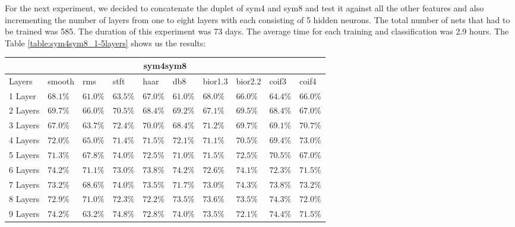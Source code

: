 For the next experiment, we decided to concatenate the duplet of sym4 and sym8 and test it against all the other features and also incrementing the number of layers from one to eight layers with each consisting of 5 hidden neurons. The total number of nets that had to be trained was 585. The duration of this experiment was 73 days. The average time for each training and classification was 2.9 hours. The Table \ref{table:sym4sym8_1-5layers} shows us the results:
\begin{table}[h!]
\renewcommand{\arraystretch}{1.2}
\begin{tabular}{ |p{1.7cm}||p{1.2cm}|p{1cm}|p{1cm}|p{1cm}|p{1cm}|p{1.1cm}|p{1.1cm}|p{1cm}|p{1cm}|}
 \hline
 \multicolumn{10}{|c|}{sym4sym8} \\
 \hline
 Layers  & smooth & rms & stft & haar & db8 & bior1.3 & bior2.2 & coif3 & coif4\\
 \hline
 1 Layer  & \cellcolor{blue!35}$68.1\%$ & $61.0\%$ &$63.5\%$ &\cellcolor{blue!35}$67.0\%$ &$61.0\%$ &\cellcolor{blue!35}$68.0\%$ &$66.0\%$ &$64.4\%$ &$66.0\%$\\
 2 Layers & \cellcolor{blue!35}$69.7\%$ & $66.0\%$ &\cellcolor{blue!35}$70.5\%$ &$68.4\%$ &$69.2\%$ &$67.1\%$ &\cellcolor{blue!35}$69.5\%$ &$68.4\%$ & $67.0\%$\\
 3 Layers &\cellcolor{blue!35} $67.0\%$ & $63.7\%$ & $72.4\%$ & $70.0\%$ &$68.4\%$ &\cellcolor{blue!35}$71.2\%$ &$69.7\%$ &$69.1\%$ &\cellcolor{blue!35}$70.7\%$\\
 4 Layers & \cellcolor{blue!35}$72.0\%$ & $65.0\%$ & $71.4\%$ & $71.5\%$ &\cellcolor{blue!35}$72.1\%$ &$71.1\%$ &$70.5\%$ &$69.4\%$ &\cellcolor{blue!35}$73.0\%$\\
 5 Layers & $71.3\%$ & $67.8\%$ &\cellcolor{blue!35}$74.0\%$ &\cellcolor{blue!35}$72.5\%$ &$71.0\%$ &$71.5\%$ &\cellcolor{blue!35}$72.5\%$ &$70.5\%$ &$67.0\%$\\
 6 Layers & \cellcolor{blue!35}$74.2\%$ & $71.1\%$ & $73.0\%$ & \cellcolor{blue!35}$73.8\%$ &\cellcolor{blue!35}$74.2\%$ &$72.6\%$ &$74.1\%$ &$72.3\%$ &$71.5\%$\\
 7 Layers & $73.2\%$ & $68.6\%$ & \cellcolor{blue!35}$74.0\%$ & $73.5\%$ &$71.7\%$ &$73.0\%$ &\cellcolor{blue!35}$74.3\%$ &\cellcolor{blue!35}$73.8\%$ &$73.2\%$\\
 8 Layers &$72.9\%$ & $71.0\%$ & $72.3\%$ & $72.2\%$ &\cellcolor{blue!35}$73.5\%$ &\cellcolor{blue!35}$73.6\%$ &$73.5\%$ & \cellcolor{blue!35}$74.3\%$ &$72.0\%$\\
 9 Layers & \cellcolor{blue!35}$74.2\%$ & $63.2\%$ & \cellcolor{blue!35}$74.8\%$ & $72.8\%$ &$74.0\%$ &$73.5\%$ &$72.1\%$ & \cellcolor{blue!35}$74.4\%$ &$71.5\%$\\

\end{tabular}
\end{table}
